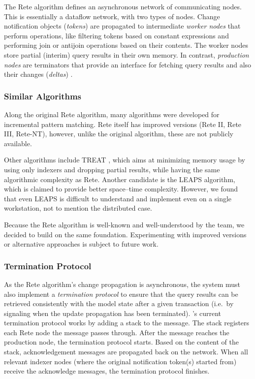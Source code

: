 The Rete algorithm defines an asynchronous network of communicating nodes. This is essentially a dataflow network, with two types of nodes. Change notification objects (\emph{tokens}) are propagated to intermediate \emph{worker nodes} that perform operations, like filtering tokens based on constant expressions and performing join or antijoin operations based on their contents. The worker nodes store partial (interim) query results in their own memory. In contrast, \emph{production nodes} are terminators that provide an interface for fetching query results and also their changes (\emph{deltas}) . %

\subsubsection{Similar Algorithms}

Along the original Rete algorithm, many algorithms were developed for incremental pattern matching. Rete itself has improved versions (Rete II, Rete III, Rete-NT), however, unlike the original algorithm, these are not publicly available. 

Other algorithms include TREAT \cite{Miranker:1991:OPT:627280.627434}, which aims at minimizing memory usage by using only indexers and dropping partial results, while having the same algorithmic complexity as Rete. Another candidate is the LEAPS \cite{Batory:1994:LA:899216} algorithm, which is claimed to provide better space--time complexity. However, we found that even LEAPS is difficult to understand and implement even on a single workstation, not to mention the distributed case. 

Because the Rete algorithm is well-known and well-understood by the \eiq{} team, we decided to build \iqd{} on the same foundation. Experimenting with improved versions or alternative approaches is subject to future work.

\subsubsection{Termination Protocol}

As the Rete algorithm's change propagation is asynchronous, the system must also implement a \emph{termination protocol} to ensure that the query results can be retrieved consistently with the model state after a given transaction (i.e.\ by signaling when the update propagation has been terminated). \iqd{}'s current termination protocol works by adding a stack to the message. The stack registers each Rete node the message passes through. After the message reaches the production node, the termination protocol starts. Based on the content of the stack, acknowledgement messages are propagated back on the network. When all relevant indexer nodes (where the original notification token(s) started from) receive the acknowledge messages, the termination protocol finishes.

